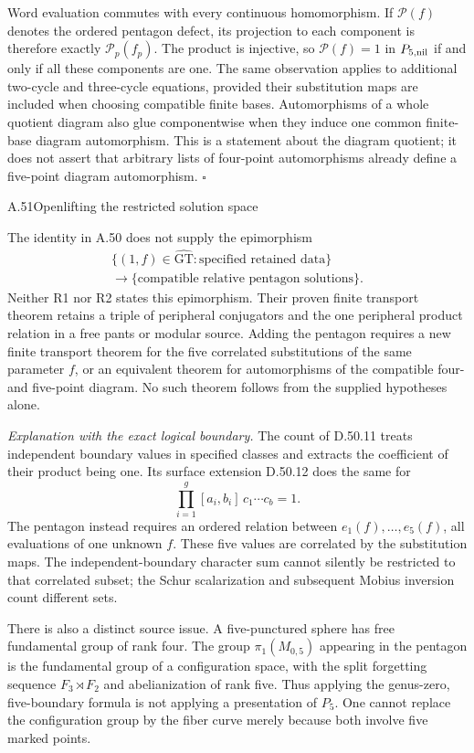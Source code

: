 Word evaluation commutes with every continuous homomorphism.
If $\mathcal P(f)$ denotes the ordered pentagon defect, its
projection to each component is therefore exactly
$\mathcal P_p(f_p)$. The product is injective, so
$\mathcal P(f)=1$ in $P_{5,\rm nil}$ if and only if all these
components are one. The same observation applies to additional
two-cycle and three-cycle equations, provided their substitution
maps are included when choosing compatible finite bases.
Automorphisms of a whole quotient diagram also glue
componentwise when they induce one common finite-base diagram
automorphism. This is a statement about the diagram quotient;
it does not assert that arbitrary lists of four-point
automorphisms already define a five-point diagram automorphism.
\hfill$\square$

\begin{statement}{A.51}{Open}{lifting the restricted solution space}
\end{statement}
The identity in A.50 does not supply the epimorphism
\[
\begin{gathered}
 \{(1,f)\in\widehat{\mathrm{GT}}:\text{specified retained data}\}\\
 \longrightarrow
 \{\text{compatible relative pentagon solutions}\}.
\end{gathered}
\]
Neither R1 nor R2 states this epimorphism. Their proven
finite transport theorem retains a triple of peripheral
conjugators and the one peripheral product relation in a free
pants or modular source. Adding the pentagon requires a new
finite transport theorem for the five correlated substitutions
of the same parameter $f$, or an equivalent theorem for
automorphisms of the compatible four- and five-point diagram.
No such theorem follows from the supplied hypotheses alone.

\emph{Explanation with the exact logical boundary.}
The count of D.50.11 treats independent boundary values in
specified classes and extracts the coefficient of their product
being one. Its surface extension D.50.12 does the same for
\[
 \prod_{i=1}^g[a_i,b_i]\,c_1\cdots c_b=1.
\]
The pentagon instead requires an ordered relation between
$e_1(f),\ldots,e_5(f)$, all evaluations of one unknown $f$.
These five values are correlated by the substitution maps.
The independent-boundary character sum cannot silently be
restricted to that correlated subset; the Schur scalarization
and subsequent Mobius inversion count different sets.

There is also a distinct source issue. A five-punctured sphere
has free fundamental group of rank four. The group
$\pi_1(M_{0,5})$ appearing in the pentagon is the fundamental
group of a configuration space, with the split forgetting
sequence $F_3\rtimes F_2$ and abelianization of rank five.
Thus applying the genus-zero, five-boundary formula is not
applying a presentation of $P_5$. One cannot replace the
configuration group by the fiber curve merely because both
involve five marked points.


